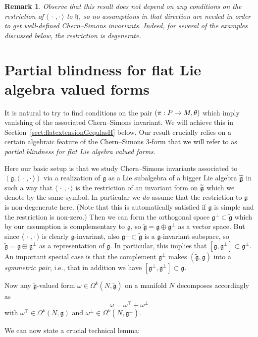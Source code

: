 \documentclass[10pt,a4paper]{amsart}
\newcommand{\om}{\omega}
\newcommand{\Om}{\Omega}
\newcommand{\B}[2]{\langle#1,#2\rangle}
\newcommand{\tfg}{\widetilde{\mathfrak g}}
\newcommand{\fkg}{\mathfrak{g}}
\newcommand{\fkh}{\mathfrak{h}}
\renewcommand*{\to}{\mathchoice{\longrightarrow}{\rightarrow}{\rightarrow}{\rightarrow}}
\let\oldtilde\tilde
\renewcommand*{\tilde}[1]{\mathchoice{\widetilde{#1}}{\widetilde{#1}}{\oldtilde{#1}}{\oldtilde{#1}}}
\newtheorem{rema}[theo]{Remark}
\theoremstyle{definition}\newtheorem{defi}[theo]{Definition}
\begin{document}
\begin{rema}
Observe that this result does not depend on any conditions on the restriction of $\B{\,\cdot\,}{\cdot\,}$ to $\fkh$, so no assumptions in that direction are needed in order to get well-defined Chern--Simons invariants. Indeed, for several of the examples discussed below, the restriction is degenerate.
\end{rema}

\setcounter{section}{4}
\section{Partial blindness for flat Lie algebra valued forms}\label{sect:partialblindness}

It is natural to try to find conditions on the pair $(\pi : P \to M,\theta)$ which imply vanishing of the associated Chern--Simons invariant. We will achieve this in Section~\ref{sect:flatextensionGequlasH} below. Our result crucially relies on a certain algebraic feature of the Chern--Simons $3$-form that we will refer to as \emph{partial blindness for flat Lie algebra valued forms}.

Here our basic setup is that we study Chern--Simons invariants associated to $(\fkg,\B{\,\cdot\,}{\cdot\,})$ via a realization of $\fkg$ as a Lie subalgebra of a bigger Lie algebra $\tilde{\fkg}$ in such a way that $\B{\,\cdot\,}{\cdot\,}$ is the restriction of an invariant form on $\tilde{\fkg}$ which we denote by the same symbol. In particular we \emph{do} assume that the restriction to $\fkg$ is non-degenerate here. (Note that this is automatically satisfied if $\fkg$ is simple and the restriction is non-zero.) Then we can form the orthogonal space $\fkg^\perp\subset\tfg$ which by our assumption is complementary to $\fkg$, so $\tfg=\fkg\oplus\fkg^\perp$ as a vector space. But since $\B{\,\cdot\,}{\cdot\,}$ is clearly $\fkg$-invariant, also $\fkg^\perp\subset\tfg$ is a $\fkg$-invariant subspace, so $\tfg=\fkg\oplus\fkg^\perp$ as a representation of $\fkg$. In particular, this implies that $[\fkg,\fkg^\perp]\subset\fkg^\perp$. An important special case is that the complement $\fkg^\perp$ makes $(\tfg,\fkg)$ into a \emph{symmetric pair}, i.e., that in addition we have $[\fkg^\perp,\fkg^\perp]\subset\fkg$.

Now any $\tfg$-valued form $\om\in\Om^k(N,\tfg)$ on a manifold $N$ decomposes accordingly as
\[
\om=\om^\top+\om^\perp
\]
with $\om^\top\in\Om^k(N,\fkg)$ and $\om^{\perp}\in\Om^k(N,\fkg^\perp)$.

We can now state a crucial technical lemma:
\end{document}
